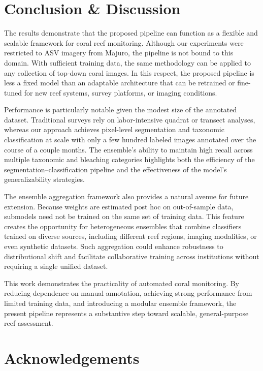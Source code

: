 \documentclass[11pt]{elsarticle}
\begin{document}
\section{Conclusion \& Discussion}

The results demonstrate that the proposed pipeline can function as a flexible and scalable framework for coral reef monitoring. Although our experiments were restricted to ASV imagery from Majuro, the pipeline is not bound to this domain. With sufficient training data, the same methodology can be applied to any collection of top-down coral images. In this respect, the proposed pipeline is less a fixed model than an adaptable architecture that can be retrained or fine-tuned for new reef systems, survey platforms, or imaging conditions.

Performance is particularly notable given the modest size of the annotated dataset. Traditional surveys rely on labor-intensive quadrat or transect analyses, whereas our approach achieves pixel-level segmentation and taxonomic classification at scale with only a few hundred labeled images annotated over the course of a couple months. The ensemble's ability to maintain high recall across multiple taxonomic and bleaching categories highlights both the efficiency of the segmentation--classification pipeline and the effectiveness of the model's generalizability strategies.

The ensemble aggregation framework also provides a natural avenue for future extension. Because weights are estimated post hoc on out-of-sample data, submodels need not be trained on the same set of training data. This feature creates the opportunity for heterogeneous ensembles that combine classifiers trained on diverse sources, including different reef regions, imaging modalities, or even synthetic datasets. Such aggregation could enhance robustness to distributional shift and facilitate collaborative training across institutions without requiring a single unified dataset.

This work demonstrates the practicality of automated coral monitoring. By reducing dependence on manual annotation, achieving strong performance from limited training data, and introducing a modular ensemble framework, the present pipeline represents a substantive step toward scalable, general-purpose reef assessment.

\section*{Acknowledgements}
\end{document}
